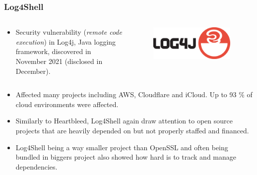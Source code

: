\documentclass[aspectratio=169]{beamer}              %
\begin{document}
\begin{frame}
	\frametitle{Log4Shell}
	
\begin{columns}
\begin{column}{0.68\textwidth}

		\begin{itemize}
			\item Security vulnerability (\emph{remote code execution}) in Log4j, Java logging framework, discovered in November 2021 (disclosed in December). \footnotemark~\footnotemark
		\end{itemize}
\end{column}

\begin{column}{0.25\textwidth}
	\begin{figure}[ht!]
	\begin{center}
  	  \includegraphics[width=0.95\textwidth]{img/log4j.png}
	\end{center}
	\end{figure}
\end{column}
\end{columns}

		\begin{itemize}
			\item Affected many projects including AWS, Cloudflare and iCloud. Up to 93 \% of cloud environments were affected.
			\item Similarly to Heartbleed, Log4Shell again draw attention to open source projects that are heavily depended on but not properly staffed and financed.\footnotemark
			\item Log4Shell being a way smaller project than OpenSSL and often being bundled in biggers project also showed how hard is to track and manage dependencies.
		\end{itemize}


\end{frame}
\end{document}
